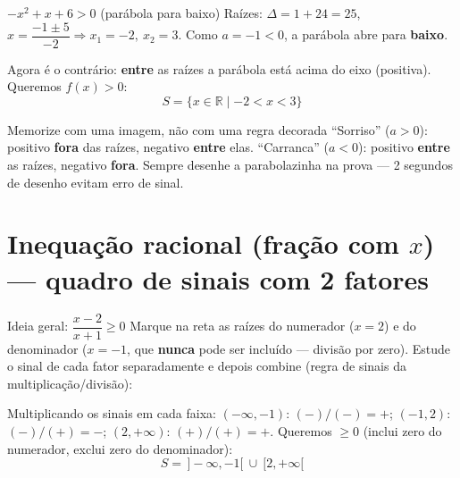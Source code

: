 \documentclass[12pt,a4paper]{article}
\begin{document}
\begin{exemplo}{$-x^2+x+6>0$ (parábola para baixo)}
Raízes: $\Delta = 1+24=25$, $x=\dfrac{-1\pm5}{-2} \Rightarrow x_1=-2,\ x_2=3$.
Como $a=-1<0$, a parábola abre para \textbf{baixo}.
\begin{center}
\end{center}
Agora é o contrário: \textbf{entre} as raízes a parábola está acima do
eixo (positiva). Queremos $f(x)>0$:
\[
S = \{x\in\mathbb{R}\mid -2<x<3\}
\]
\end{exemplo}

\begin{dica}{Memorize com uma imagem, não com uma regra decorada}
``Sorriso'' ($a>0$): positivo \textbf{fora} das raízes, negativo
\textbf{entre} elas. ``Carranca'' ($a<0$): positivo \textbf{entre} as
raízes, negativo \textbf{fora}. Sempre desenhe a parabolazinha na prova —
2 segundos de desenho evitam erro de sinal.
\end{dica}

\section{Inequação racional (fração com $x$) — quadro de sinais com 2 fatores}

\begin{exemplo}{Ideia geral: $\dfrac{x-2}{x+1}\ge0$}
Marque na reta as raízes do numerador ($x=2$) e do denominador ($x=-1$,
que \textbf{nunca} pode ser incluído — divisão por zero). Estude o sinal de
cada fator separadamente e depois combine (regra de sinais da
multiplicação/divisão):
\begin{center}
\end{center}
Multiplicando os sinais em cada faixa: $(-\infty,-1)$: $(-)/(-) = +$;
$(-1,2)$: $(-)/(+) = -$; $(2,+\infty)$: $(+)/(+)=+$. Queremos $\ge0$
(inclui zero do numerador, exclui zero do denominador):
\[
S = \,]-\infty,-1[\ \cup\ [2,+\infty[
\]
\end{exemplo}
\end{document}
